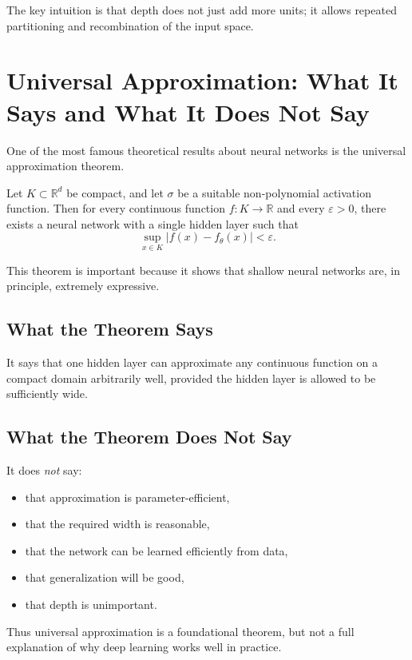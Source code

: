 The key intuition is that depth does not just add more units; it allows repeated partitioning and recombination of the input space.

\section{Universal Approximation: What It Says and What It Does Not Say}

One of the most famous theoretical results about neural networks is the universal approximation theorem.

\begin{theorem}
Let $K\subset\mathbb R^d$ be compact, and let $\sigma$ be a suitable non-polynomial activation function. Then for every continuous function $f:K\to\mathbb R$ and every $\varepsilon>0$, there exists a neural network with a single hidden layer such that
\[
\sup_{x\in K}|f(x)-f_{\theta}(x)|<\varepsilon.
\]
\end{theorem}

This theorem is important because it shows that shallow neural networks are, in principle, extremely expressive.

\subsection{What the Theorem Says}

It says that one hidden layer can approximate any continuous function on a compact domain arbitrarily well, provided the hidden layer is allowed to be sufficiently wide.

\subsection{What the Theorem Does Not Say}

It does \emph{not} say:
\begin{itemize}
    \item that approximation is parameter-efficient,
    \item that the required width is reasonable,
    \item that the network can be learned efficiently from data,
    \item that generalization will be good,
    \item that depth is unimportant.
\end{itemize}

Thus universal approximation is a foundational theorem, but not a full explanation of why deep learning works well in practice.

